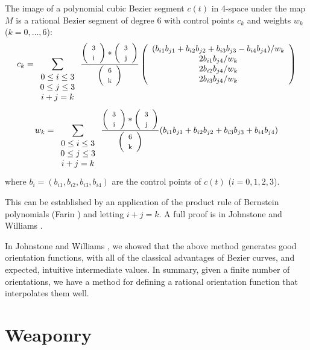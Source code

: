 \begin{lemma}
\label{sextic}
The image of a polynomial cubic Bezier segment $c(t)$ in 4-space 
under the map $M$
is a rational Bezier segment of degree 6 with control points $c_k$
and weights $w_k$ ($k = 0, \ldots, 6$):
\begin{equation}
\label{eq:control-pts}
c_k = \sum_{\begin{array}{c} 0 \leq i \leq 3 \\ 
			     0 \leq j \leq 3 \\ 
			     i+j=k
			     \end{array}} 
        \frac{\left( \begin{array}{c} \mbox{\footnotesize{3}} \\ \mbox{\footnotesize{i}} \end{array} \right) * \left( \begin{array}{c} \mbox{\footnotesize{3}} \\ \mbox{\footnotesize{j}} \end{array} \right)}{\left( \begin{array}{c} \mbox{\footnotesize{6}} \\ \mbox{\footnotesize{k}} \end{array} \right)}
	\left( \begin{array}{c}
            (b_{i1} b_{j1} + b_{i2} b_{j2} + b_{i3} b_{j3} - b_{i4} b_{j4}) / w_k \\
            2b_{i1} b_{j4} / w_k \\
            2b_{i2} b_{j4} / w_k \\
            2b_{i3} b_{j4} / w_k
	\end{array} \right)
\end{equation}
\begin{equation}
w_k = \sum_{\begin{array}{c} 0 \leq i \leq 3 \\ 
			     0 \leq j \leq 3 \\ 
			     i+j=k
			     \end{array}}
        \frac{\left( \begin{array}{c} \mbox{\footnotesize{3}} \\ \mbox{\footnotesize{i}} \end{array} \right) * \left( \begin{array}{c} \mbox{\footnotesize{3}} \\ \mbox{\footnotesize{j}} \end{array} \right)}{\left( \begin{array}{c} \mbox{\footnotesize{6}} \\ \mbox{\footnotesize{k}} \end{array} \right)}
	(b_{i1} b_{j1} + b_{i2} b_{j2} + b_{i3} b_{j3} + b_{i4} b_{j4})
\end{equation}
where $b_i = (b_{i1},b_{i2},b_{i3},b_{i4})$ are the control points of $c(t)$
($i=0,1,2,3$).
\end{lemma}
\prf
This can be established by an application of the product rule
of Bernstein polynomials (Farin \cite{farin93})
and letting $i+j=k$.
A full proof is in Johnstone and Williams \cite{jjjimbo94a}.
\QED

In Johnstone and Williams \cite{jjjimbo94a}, we showed that the above
method generates good orientation functions, with all of the classical
advantages of Bezier curves, and expected, intuitive intermediate values.
In summary, given a finite number of orientations, we have a method
for defining a rational orientation function that interpolates them well.


\section{Weaponry}
\label{sec:weapon}

